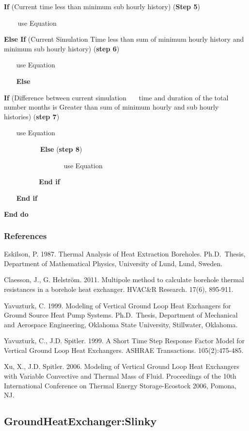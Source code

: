 \textbf{If} (Current time less than minimum sub hourly history) (\textbf{Step 5})

\textbf{~~~} use Equation

\textbf{Else If} (Current Simulation Time less than sum of minimum hourly history and minimum sub hourly history) (\textbf{step 6})

~~~ use Equation

~~~ \textbf{Else}

\textbf{If} (Difference between current simulation~~~ time and duration of the total number months is Greater than sum of minimum hourly and sub hourly histories) (\textbf{step 7})

~~~ use Equation

~~~~~~~~~~ \textbf{Else} (\textbf{step 8})

~~~~~~~~~~~~~~~~~ use Equation

~~~ ~~~~~~ \textbf{End if}

~~~ \textbf{End if}

\textbf{End do}

\subsubsection{References}\label{references-2-006}

Eskilson, P. 1987. Thermal Analysis of Heat Extraction Boreholes. Ph.D.~Thesis, Department of Mathematical Physics, University of Lund, Lund, Sweden.

Claesson, J., G. Helstr{\"o}m. 2011. Multipole method to calculate borehole thermal resistances in a borehole heat exchanger. HVAC\&R Research. 17(6), 895-911.

Yavuzturk, C. 1999. Modeling of Vertical Ground Loop Heat Exchangers for Ground Source Heat Pump Systems. Ph.D.~Thesis, Department of Mechanical and Aerospace Engineering, Oklahoma State University, Stillwater, Oklahoma.

Yavuzturk, C., J.D. Spitler. 1999. A Short Time Step Response Factor Model for Vertical Ground Loop Heat Exchangers. ASHRAE Transactions. 105(2):475-485.

Xu, X., J.D. Spitler. 2006. Modeling of Vertical Ground Loop Heat Exchangers with Variable Convective and Thermal Mass of Fluid. Proceedings of the 10th International Conference on Thermal Energy Storage-Ecostock 2006, Pomona, NJ.

\subsection{GroundHeatExchanger:Slinky}\label{groundheatexchangerslinky}

